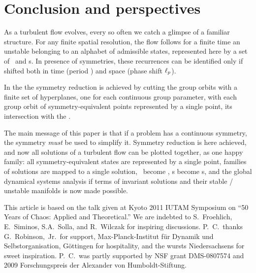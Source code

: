 
\section{Conclusion and perspectives}
\label{s:concl}


As a turbulent flow evolves, every so often we catch a glimpse of a
familiar structure. For any finite spatial resolution, the flow follows
for a finite time an unstable {\cohStr} belonging to an alphabet of
admissible states, represented here by a set of \reqva\ and \rpo s. In
presence of symmetries, these recurrences can be identified only if
shifted both in time (period ) and space (phase shift
$\ell_p$).

In the \mslices{} the
symmetry reduction is achieved by cutting the group orbits with a finite
set of hyperplanes, one for each continuous group parameter, with each
group orbit of symmetry-equivalent points represented by a single point,
its intersection with the \slice.

The main message of this paper is that if a problem has a continuous
symmetry, the symmetry \emph{must} be used to simplify it. Symmetry
reduction is here achieved, and now all solutions of a turbulent flow can
be plotted together, as one happy family: all symmetry-equivalent states
are represented by a single point, families of solutions are mapped to a
single solution, \reqva\ become \eqva, \rpo s become \po s, and the
global dynamical systems analysis if terms of invariant solutions and
their stable / unstable manifolds is now made possible.

\begin{acknowledgments}
This article is based on the talk given at
Kyoto 2011 IUTAM Symposium on ``50 Years of Chaos: Applied and Theoretical.''
We are indebted to
S.~Froehlich,
E.~Siminos,
S.A.~Solla,
and
R.~Wilczak
for inspiring discussions.
P.~C.\ thanks G.~Robinson,~Jr.\ for support,
Max-Planck-Institut f\"ur Dynamik und Selbstorganisation,
G\"ottingen for hospitality,
and the wursts Niedersachsens for sweet inspiration.
P.~C.\ was partly supported by NSF grant DMS-0807574
and
2009 Forschungspreis der Alexander von Humboldt-Stiftung.
\end{acknowledgments}
